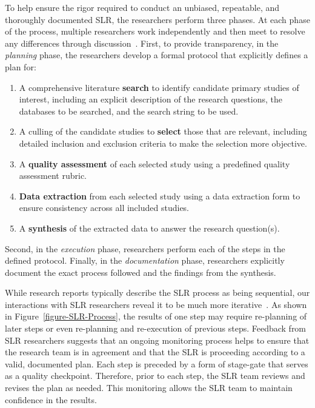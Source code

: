 To help ensure the rigor required to conduct an unbiased, repeatable, and thoroughly documented SLR, the researchers perform three phases.
At each phase of the process, multiple researchers work independently and then meet to resolve any differences through discussion~\cite{Kitchenham:04, Kitchenham_Charters:07, Biolchini-etal:05}.
First, to provide transparency, in the \textit{planning} phase, the researchers develop a formal protocol that explicitly defines a plan for:
\vspace{-8pt}
\begin{enumerate}
	\item A comprehensive literature \textbf{search} to identify candidate primary studies of interest, including an explicit description of the research questions, the databases to be searched, and the search string to be used.
	\vspace{-4pt}
	\item A culling of the candidate studies to \textbf{select} those that are relevant, including detailed inclusion and exclusion criteria to make the selection more objective.
	\vspace{-4pt}
	\item A \textbf{quality assessment} of each selected study using a predefined quality assessment rubric.
	\vspace{-4pt}
	\item \textbf{Data extraction} from each selected study using a data extraction form to ensure consistency across all included studies.
	\vspace{-4pt}
	\item A \textbf{synthesis} of the extracted data to answer the research question(s).
\end{enumerate}
\vspace{-4pt}
Second, in the \textit{execution} phase, researchers perform each of the steps in the defined protocol.
Finally, in the \textit{documentation} phase, researchers explicitly document the exact process followed and the findings from the synthesis.  

While research reports typically describe the SLR process as being sequential, our interactions with SLR researchers reveal it to be much more iterative~\cite{Carver-etal:13, Hassler-etal:14}.
As shown in Figure~\ref{figure-SLR-Process}, the results of one step may require re-planning of later steps or even re-planning and re-execution of previous steps.
Feedback from SLR researchers suggests that an ongoing monitoring process helps to ensure that the research team is in agreement and that the SLR is proceeding according to a valid, documented plan.
Each step is preceded by a form of stage-gate that serves as a quality checkpoint.
Therefore, prior to each step, the SLR team reviews and revises the plan as needed.
This monitoring allows the SLR team to maintain confidence in the results. 

